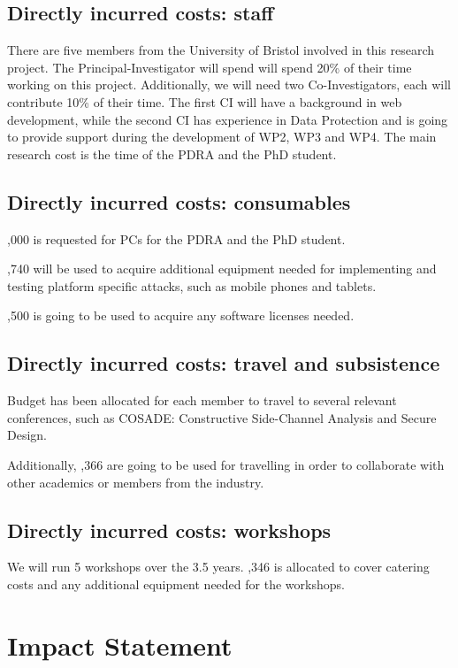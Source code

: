\documentclass[a4paper,11pt]{article}
\begin{document}
\subsection*{Directly incurred costs: staff}
There are five members from the University of Bristol involved in this research project. The Principal-Investigator will spend will spend 20\% of their time working on this project. Additionally, we will need two Co-Investigators, each will contribute 10\% of their time. The first CI will have a background in web development, while the second CI has experience in Data Protection and is going to provide support during the development of WP2, WP3 and WP4. The main research cost is the time of the PDRA and the PhD student.

\subsection*{Directly incurred costs: consumables}
,000 is requested for PCs for the PDRA and the PhD student.

,740 will be used to acquire additional equipment needed for implementing and testing platform specific attacks, such as mobile phones and tablets.

,500 is going to be used to acquire any software licenses needed.

\subsection*{Directly incurred costs: travel and subsistence}
Budget has been allocated for each member to travel to several relevant conferences, such as COSADE: Constructive Side-Channel Analysis and Secure Design.

Additionally, ,366 are going to be used for travelling in order to collaborate with other academics or members from the industry.

\subsection*{Directly incurred costs: workshops}
We will run 5 workshops over the 3.5 years. ,346 is allocated to cover catering costs and any additional equipment needed for the workshops.
 

\newpage
\section*{Impact Statement}
\end{document}
